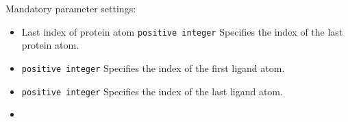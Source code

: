 Mandatory parameter settings:\\
\begin{itemize}
\item
{} {Last index of protein atom} {{\tt positive integer}} { Specifies the index of the last protein atom. } 

\item
{} {{\tt positive integer}} {Specifies the index of the first ligand atom.}

\item
{} {{\tt positive integer}} {Specifies the index of the last ligand atom. }

\item
{}
\end{itemize}

